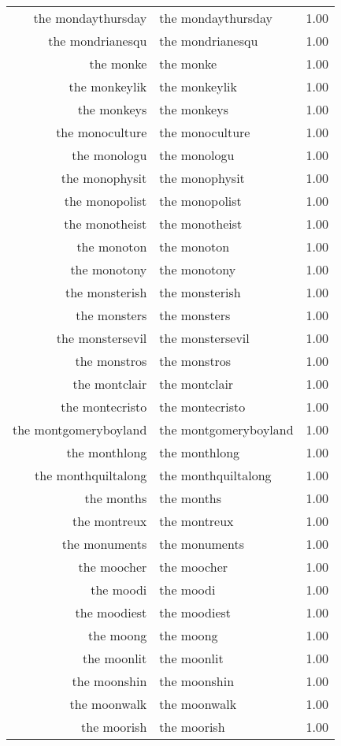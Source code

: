 \begin{table}[ht]
\begin{tabular}{rlr}
  the mondaythursday & the mondaythursday & 1.00 \\ 
  the mondrianesqu & the mondrianesqu & 1.00 \\ 
  the monke & the monke & 1.00 \\ 
  the monkeylik & the monkeylik & 1.00 \\ 
  the monkeys & the monkeys & 1.00 \\ 
  the monoculture & the monoculture & 1.00 \\ 
  the monologu & the monologu & 1.00 \\ 
  the monophysit & the monophysit & 1.00 \\ 
  the monopolist & the monopolist & 1.00 \\ 
  the monotheist & the monotheist & 1.00 \\ 
  the monoton & the monoton & 1.00 \\ 
  the monotony & the monotony & 1.00 \\ 
  the monsterish & the monsterish & 1.00 \\ 
  the monsters & the monsters & 1.00 \\ 
  the monstersevil & the monstersevil & 1.00 \\ 
  the monstros & the monstros & 1.00 \\ 
  the montclair & the montclair & 1.00 \\ 
  the montecristo & the montecristo & 1.00 \\ 
  the montgomeryboyland & the montgomeryboyland & 1.00 \\ 
  the monthlong & the monthlong & 1.00 \\ 
  the monthquiltalong & the monthquiltalong & 1.00 \\ 
  the months & the months & 1.00 \\ 
  the montreux & the montreux & 1.00 \\ 
  the monuments & the monuments & 1.00 \\ 
  the moocher & the moocher & 1.00 \\ 
  the moodi & the moodi & 1.00 \\ 
  the moodiest & the moodiest & 1.00 \\ 
  the moong & the moong & 1.00 \\ 
  the moonlit & the moonlit & 1.00 \\ 
  the moonshin & the moonshin & 1.00 \\ 
  the moonwalk & the moonwalk & 1.00 \\ 
  the moorish & the moorish & 1.00 \\ 

\end{tabular}
\end{table}
